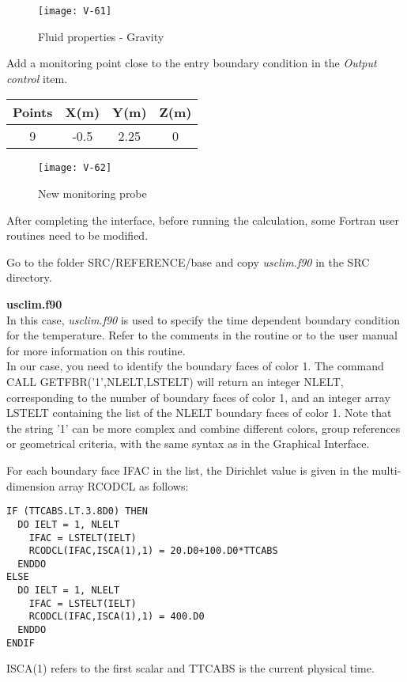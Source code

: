 \begin{figure}[h!]
\begin{center}
\texttt{[image: V-61]}
\caption{Fluid properties - Gravity}
\label{fig2_e3}
\end{center}
\end{figure}


\newpage
Add a monitoring point close to the entry boundary condition in the
{\itshape Output control} item.

\begin{center}
\begin{tabular}{|c|c|c|c|}
\hline
Points & X(m) & Y(m) & Z(m)\\
\hline
9 & -0.5 & 2.25 & 0 \\
\hline
\end{tabular}
\end{center}

\begin{figure}[h!]
\begin{center}
\texttt{[image: V-62]}
\caption{New monitoring probe}
\label{fig3_e3}
\end{center}
\end{figure}


\newpage
After completing the interface, before running the calculation,
some Fortran user routines need to be modified.

Go to the folder SRC/REFERENCE/base and copy {\itshape usclim.f90} in the SRC directory.

\textbf{usclim.f90}\\
In this case, {\itshape usclim.f90} is used to specify the time dependent boundary
condition for
the temperature. Refer to the comments in the routine or to the \CS user manual
for more information on this routine.\\
In our case, you need to identify the boundary faces of color 1. The command\\
CALL GETFBR('1',NLELT,LSTELT)
will return an integer NLELT, corresponding to the number of boundary faces of
color 1, and an integer array LSTELT containing the list of the NLELT boundary
faces of color 1. Note that the string '1' can be more complex and combine
different colors, group references or geometrical criteria, with the same syntax
as in the Graphical Interface.

For each boundary face IFAC in the list, the Dirichlet value is given in the
multi-dimension array RCODCL as follows:
\begin{verbatim}
IF (TTCABS.LT.3.8D0) THEN
  DO IELT = 1, NLELT
    IFAC = LSTELT(IELT)
    RCODCL(IFAC,ISCA(1),1) = 20.D0+100.D0*TTCABS
  ENDDO
ELSE
  DO IELT = 1, NLELT
    IFAC = LSTELT(IELT)
    RCODCL(IFAC,ISCA(1),1) = 400.D0
  ENDDO
ENDIF
\end{verbatim}
ISCA(1) refers to the first scalar and TTCABS is the current physical time.


